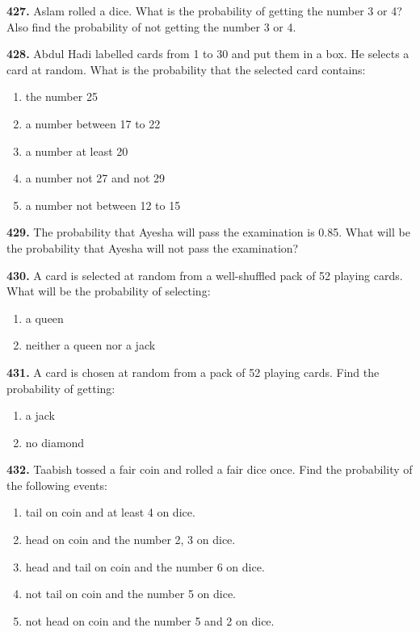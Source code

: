 \documentclass[11pt]{article}
\begin{document}
\bigskip
\noindent\textbf{427.} Aslam rolled a dice. What is the probability of getting the number 3 or 4? Also find the probability of not getting the number 3 or 4.

\bigskip
\noindent\textbf{428.} Abdul Hadi labelled cards from 1 to 30 and put them in a box. He selects a card at random. What is the probability that the selected card contains:
\begin{enumerate}[label=(\roman*)]
\item the number 25
\item a number between 17 to 22
\item a number at least 20
\item a number not 27 and not 29
\item a number not between 12 to 15
\end{enumerate}

\bigskip
\noindent\textbf{429.} The probability that Ayesha will pass the examination is 0.85. What will be the probability that Ayesha will not pass the examination?

\bigskip
\noindent\textbf{430.} A card is selected at random from a well-shuffled pack of 52 playing cards. What will be the probability of selecting:
\begin{enumerate}[label=(\roman*)]
\item a queen
\item neither a queen nor a jack
\end{enumerate}

\bigskip
\noindent\textbf{431.} A card is chosen at random from a pack of 52 playing cards. Find the probability of getting:
\begin{enumerate}[label=(\roman*)]
\item a jack
\item no diamond
\end{enumerate}

\bigskip
\noindent\textbf{432.} Taabish tossed a fair coin and rolled a fair dice once. Find the probability of the following events:
\begin{enumerate}[label=(\roman*)]
\item tail on coin and at least 4 on dice.
\item head on coin and the number 2, 3 on dice.
\item head and tail on coin and the number 6 on dice.
\item not tail on coin and the number 5 on dice.
\item not head on coin and the number 5 and 2 on dice.
\end{enumerate}
\end{document}
